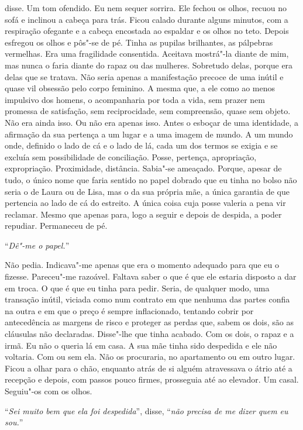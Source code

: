 disse. Um tom ofendido. Eu nem sequer sorrira. Ele fechou os olhos,
recuou no sofá e inclinou a cabeça para trás. Ficou calado durante
alguns minutos, com a respiração ofegante e a cabeça encostada ao
espaldar e os olhos no teto. Depois esfregou os olhos e pôs"-se de pé.
Tinha as pupilas brilhantes, as pálpebras vermelhas. Era uma fragilidade
consentida. Aceitava mostrá"-la diante de mim, mas nunca o faria diante
do rapaz ou das mulheres. Sobretudo delas, porque era delas que se
tratava. Não seria apenas a manifestação precoce de uma inútil e quase
vil obsessão pelo corpo feminino. A mesma que, a ele como ao menos
impulsivo dos homens, o acompanharia por toda a vida, sem prazer nem
promessa de satisfação, sem reciprocidade, sem compreensão, quase sem
objeto. Não era ainda isso. Ou não era apenas isso. Antes o esboçar de
uma identidade, a afirmação da sua pertença a um lugar e a uma imagem de
mundo. A um mundo onde, definido o lado de cá e o lado de lá, cada um
dos termos se exigia e se excluía sem possibilidade de conciliação.
Posse, pertença, apropriação, expropriação. Proximidade, distância.
Sabia"-se ameaçado. Porque, apesar de tudo, o único nome que faria
sentido no papel dobrado que eu tinha no bolso não seria o de Laura ou
de Lisa, mas o da sua própria mãe, a única garantia de que pertencia ao
lado de cá do estreito. A única coisa cuja posse valeria a pena vir
reclamar. Mesmo que apenas para, logo a seguir e depois de despida, a
poder repudiar. Permaneceu de pé.

``\emph{Dê"-me o papel.}''

Não pedia. Indicava"-me apenas que era o momento adequado para que eu o
fizesse. Pareceu"-me razoável. Faltava saber o que é que ele estaria
disposto a dar em troca. O que é que eu tinha para pedir. Seria, de
qualquer modo, uma transação inútil, viciada como num contrato em que
nenhuma das partes confia na outra e em que o preço é sempre
inflacionado, tentando cobrir por antecedência as margens de risco e
proteger as perdas que, sabem os dois, são as cláusulas não declaradas.
Disse"-lhe que tinha acabado. Com os dois, o rapaz e a irmã. Eu não o
queria lá em casa. A sua mãe tinha sido despedida e ele não voltaria.
Com ou sem ela. Não os procuraria, no apartamento ou em outro lugar.
Ficou a olhar para o chão, enquanto atrás de si alguém atravessava o
átrio até a recepção e depois, com passos pouco firmes, prosseguia até
ao elevador. Um casal. Seguiu"-os com os olhos.

``\emph{Sei muito bem que ela foi despedida}'',
disse,
``\emph{não precisa de me dizer quem eu sou.}''

